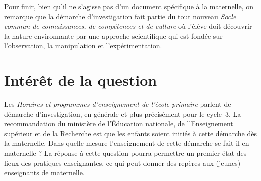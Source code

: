 Pour finir, bien qu’il ne s’agisse pas d’un document spécifique à la maternelle, on remarque que la démarche d’investigation fait partie du tout nouveau \emph{Socle commun de connaissances, de compétences et de culture} \cite{Socle2015} où l’élève doit découvrir la nature environnante par une approche scientifique qui est fondée sur l’observation, la manipulation et l’expérimentation.

\section{Intérêt de la question}
Les \textit{Horaires et programmes d’enseignement de l’école primaire} \cite{BO2008} parlent de démarche d’investigation, en générale et plus précisément pour le cycle~3. La recommandation du ministère de l’Éducation nationale, de l’Enseignement supérieur et de la Recherche est que les enfants soient initiés à cette démarche dès la maternelle. Dans quelle mesure l’enseignement de cette démarche se fait-il en maternelle ? La réponse à cette question pourra permettre un premier état des lieux des pratiques enseignantes, ce qui peut donner des repères aux (jeunes) enseignants de maternelle.